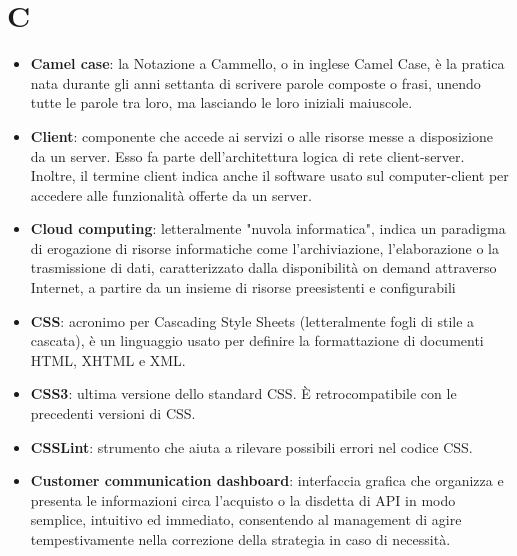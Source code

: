 \newpage
\section{C}

\begin{itemize}
	\item \textbf{Camel case}: la Notazione a Cammello, o in inglese Camel Case, è la pratica nata durante gli anni settanta di scrivere parole composte o frasi, unendo tutte le parole tra loro, ma lasciando le loro iniziali maiuscole.
	\item \textbf{Client}: componente che accede ai servizi o alle risorse messe a disposizione da un server. Esso fa parte dell'architettura logica di rete client-server. Inoltre, il termine client indica anche il software usato sul computer-client per accedere alle funzionalità offerte da un server.
	\item \textbf{Cloud computing}: letteralmente "nuvola informatica", indica un paradigma di erogazione di risorse informatiche come l'archiviazione, l'elaborazione o la trasmissione di dati, caratterizzato dalla disponibilità on demand attraverso Internet, a partire da un insieme di risorse preesistenti e configurabili
	\item \textbf{CSS}: acronimo per Cascading Style Sheets (letteralmente fogli di stile a cascata), è un linguaggio usato per definire la formattazione di documenti HTML, XHTML e XML.
	\item \textbf{CSS3}: ultima versione dello standard CSS. \MakeUppercase{è} retrocompatibile con le precedenti versioni di CSS.
	\item \textbf{CSSLint}: strumento che aiuta a rilevare possibili errori nel codice CSS.
	\item \textbf{Customer communication dashboard}: interfaccia grafica che organizza e presenta le informazioni circa l'acquisto o la disdetta di API in modo semplice, intuitivo ed immediato, consentendo al management di agire tempestivamente nella correzione della strategia in caso di necessità.
\end{itemize}


	
